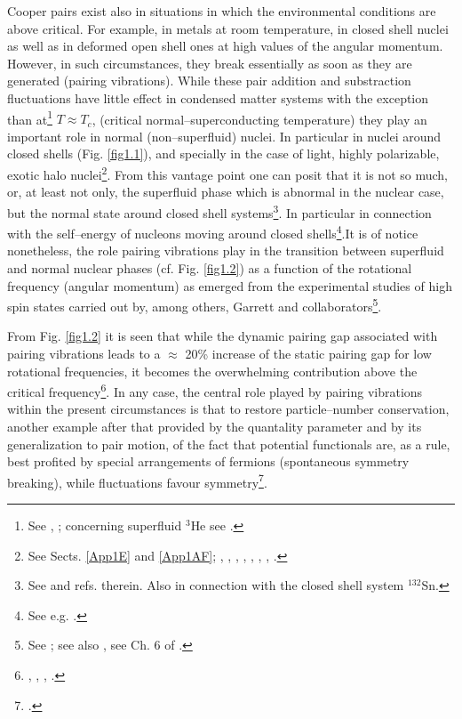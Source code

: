  Cooper pairs exist also in situations in which the environmental conditions are above critical. For example, in metals at room temperature, in closed shell nuclei as well as in deformed open shell ones at high values of the angular momentum. However, in such circumstances, they break essentially as soon as they are generated (pairing vibrations). While these pair addition and substraction fluctuations have little effect in condensed matter systems with the exception than at\footnote{See \cite{Schmidt:68}, \cite{Schmid:69} \cite{Abrahams:68}; concerning superfluid $^3$He see \cite{Wolfe:78}.} $T\approx T_c$, (critical normal--superconducting temperature) they play an important role in normal (non--superfluid) nuclei. In particular in nuclei around closed shells (Fig. \ref{fig1.1}), and specially in the case of light, highly polarizable, exotic halo nuclei\footnote{See Sects. \ref{App1E} and \ref{App1AF}; \cite{Bohr:75} , \cite{Bes:66}, \cite{Hogassen:61}, \cite{Schmidt:72}, \cite{Schmidt:68}, \cite{Barranco:01}, \cite{Potel:13}, \cite{Potel:14}.}. From this vantage point one can posit that it is not so much, or, at least not only, the superfluid phase which is abnormal in the nuclear case, but the normal state around closed shell systems\footnote{See \cite{Potel:13} and refs. therein. Also \cite{Potel:13b} in connection with the closed shell system $^{132}$Sn.}. In particular in connection with the self--energy of nucleons moving around closed shells\footnote{See e.g. \cite{Bes:71,Bes:71b,Bes:71c}.}.It is of notice nonetheless, the role pairing vibrations play in the  transition between superfluid and normal nuclear phases (cf. Fig. \ref{fig1.2}) as a function of the rotational frequency (angular momentum) as emerged from the experimental studies of high spin states carried out by, among others, Garrett and collaborators\footnote{See \cite{Shimizu:89}; see also \cite{Barranco:87b}, see Ch. 6 of \cite{Brink:05}.}.
 
 
  From Fig. \ref{fig1.2} it is seen that while the dynamic pairing gap associated with pairing vibrations leads to a $\approx$ 20\% increase of the static pairing gap for low rotational frequencies, it becomes the overwhelming contribution above the critical frequency\footnote{\cite{Shimizu:89}, \cite{Shimizu:90}, \cite{Shimizu:13},  \cite{Donau:99} \cite{Shimizu:00}.}. In any case, the central role played by pairing vibrations within the present circumstances is that to restore particle--number conservation, another example after that provided by the quantality parameter and by its generalization to pair motion, of the fact that potential functionals are, as a rule, best profited by special arrangements of fermions (spontaneous symmetry breaking), while fluctuations favour symmetry\footnote{\cite{Anderson:84,Anderson:76}.}. 
  
